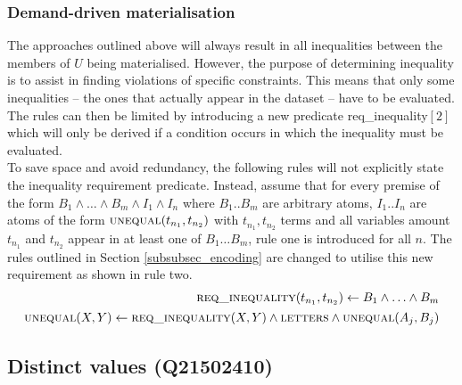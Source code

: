 \documentclass[hyperref,bachelorofscience,fleqn]{cgvpub}
\begin{document}
\subsubsection{Demand-driven materialisation}\label{subsubsec_demand-driven_materialisation}
The approaches outlined above will always result in all inequalities between the members of \(U\) being materialised. However, the purpose of determining inequality is to assist in finding violations of specific constraints. This means that only some inequalities -- the ones that actually appear in the dataset -- have to be evaluated. The rules can then be limited by introducing a new predicate req\_inequality\([2]\) which will only be derived if a condition occurs in which the inequality must be evaluated.\\

To save space and avoid redundancy, the following rules will not explicitly state the inequality requirement predicate. Instead, assume that for every premise of the form \(B_1 \wedge \ldots\wedge B_m \wedge I_1 \wedge I_n\) where \(B_1 .. B_m\) are arbitrary atoms, \(I_1 .. I_n\) are atoms of the form \(\textsc{unequal}(t_{n_1}, t_{n_2})\) with \(t_{n_1}, t_{n_2}\) terms and all variables amount \(t_{n_1}\) and \(t_{n_2}\) appear in at least one of \(B_1 \ldots B_m\), rule one is introduced for all \(n\). The rules outlined in Section \ref{subsubsec_encoding} are changed to utilise this new requirement as shown in rule two.
\begin{align}
\begin{split}
\textsc{req\_inequality}(t_{n_1}, t_{n_2})
 \leftarrow B_1 \wedge \ldots \wedge B_m
\end{split}\\
\begin{split}
\textsc{unequal}(X, Y) \leftarrow \textsc{req\_inequality}	(X, Y) \wedge \textsc{letters} \wedge \textsc{unequal}(A_j, B_j)
\end{split}
\end{align}

\subsection{Distinct values (Q21502410)}\label{subsec_distinct_values}
\end{document}
